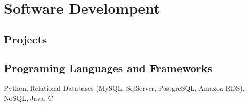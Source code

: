 \section{Software Develompent}

\subsection{Projects}

\subsection{Programing Languages and Frameworks}
Python,
Relational Databases (MySQL, SqlServer, PostgreSQL, Amazon RDS),
NoSQL,
Java,
C
